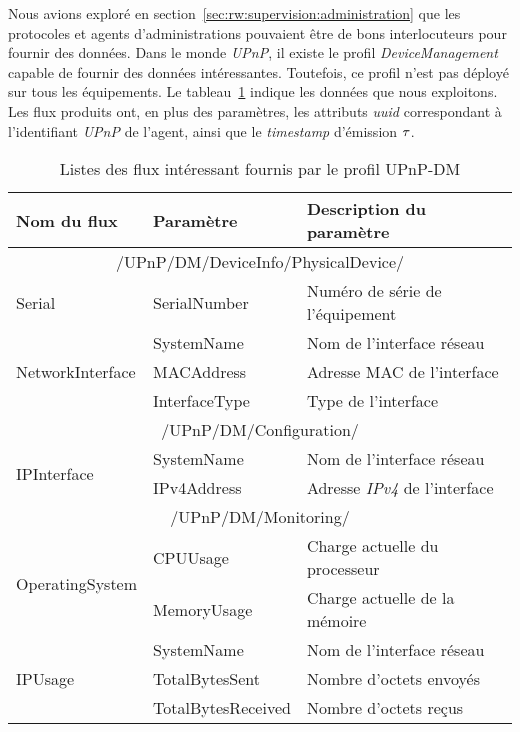 Nous avions exploré en section~\ref{sec:rw:supervision:administration} que les protocoles et agents d'administrations pouvaient être de bons interlocuteurs pour fournir des données. Dans le monde \textit{UPnP}, il existe le profil \textit{DeviceManagement} capable de fournir des données intéressantes. Toutefois, ce profil n'est pas déployé sur tous les équipements. Le tableau~\ref{tab:valid:domvision:upnpdm} indique les données que nous exploitons. Les flux produits ont, en plus des paramètres, les attributs \textit{uuid} correspondant à l'identifiant \textit{UPnP} de l'agent, ainsi que le \textit{timestamp} d'émission $\tau$.

\begin{table}
\centering
\begin{tabular}{|m{}|>{\ttfamily}m{}|m{}|} \bottomrule
\rowcolor{hypcolor} Nom du flux & \rm Paramètre & Description du paramètre\\ \hline
\multicolumn{3}{|c|}{/UPnP/DM/DeviceInfo/PhysicalDevice/} \\\hline
Serial & {SerialNumber} & Numéro de série de l'équipement\\\hline
\multirow{3}{*}{NetworkInterface} & {SystemName} & Nom de l'interface réseau\\\cline{2-3}
& {MACAddress} & Adresse MAC de l'interface\\\cline{2-3}
& InterfaceType & Type de l'interface \\\hline
\multicolumn{3}{|c|}{/UPnP/DM/Configuration/} \\\hline
\multirow{2}{*}{IPInterface} & SystemName & Nom de l'interface réseau \\\cline{2-3}
& IPv4Address & Adresse \textit{IPv4} de l'interface \\ \hline
\multicolumn{3}{|c|}{/UPnP/DM/Monitoring/} \\\hline
\multirow{2}{*}{OperatingSystem} & CPUUsage & Charge actuelle du processeur\\\cline{2-3}
& MemoryUsage & Charge actuelle de la mémoire\\ \hline
\multirow{3}{*}{IPUsage} & SystemName & Nom de l'interface réseau\\ \cline{2-3}
& TotalBytesSent & Nombre d'octets envoyés \\\cline{2-3}
& TotalBytesReceived & Nombre d'octets reçus \\ \toprule
\end{tabular}
\caption{Listes des flux intéressant fournis par le profil UPnP-DM}\label{tab:valid:domvision:upnpdm}
\end{table}

